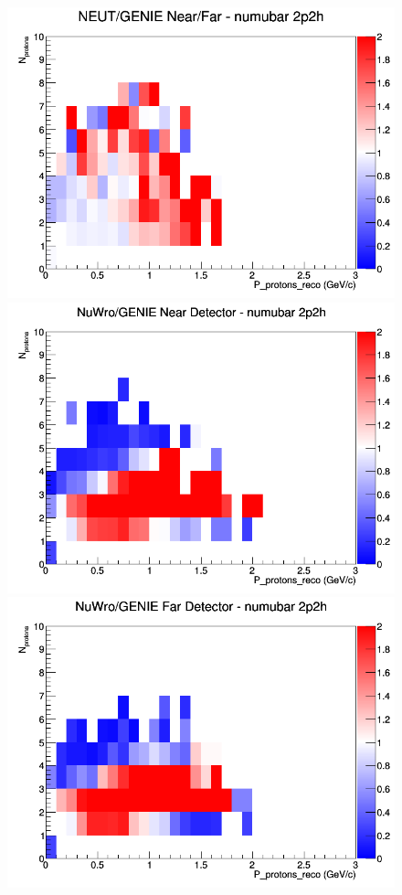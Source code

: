 \documentclass[12pt]{article}
\begin{document}
\begin{figure}[h]
\endminipage
{}
\includegraphics[width=\linewidth]{eff_N_P/LAr/protons/ratios/2p2h_NEUT_GENIE_numubar_NF_N_P.png}
\endminipage
\newline
{}
\includegraphics[width=\linewidth]{eff_N_P/LAr/protons/ratios/2p2h_NuWro_GENIE_numubar_near_N_P.png}
\endminipage
{}
\includegraphics[width=\linewidth]{eff_N_P/LAr/protons/ratios/2p2h_NuWro_GENIE_numubar_far_N_P.png}

\end{figure}
\end{document}
